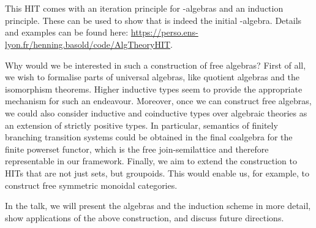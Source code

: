 \documentclass{easychair}
\begin{document}
\begin{code}
\AgdaSpace{}%
\AgdaSymbol{)}\AgdaSpace{}%
\AgdaSpace{}%
\AgdaSpace{}%
\<%
\\
\>[6]%
\>[13]\AgdaSymbol{:}\AgdaSpace{}%
\AgdaSpace{}%
\AgdaSymbol{\{}\AgdaSpace{}%
\AgdaSymbol{\}}\AgdaSpace{}%
\AgdaSpace{}%
\AgdaSpace{}%
\AgdaSpace{}%
\AgdaSpace{}%
\AgdaSpace{}%
\AgdaSpace{}%
\AgdaSpace{}%
\AgdaOperator{\AgdaDatatype{==}}\AgdaSpace{}%
\AgdaSpace{}%
\<%
\\
%
\>[6]%
\>[13]\AgdaSymbol{:}\AgdaSpace{}%
\AgdaSpace{}%
\AgdaSymbol{(}\AgdaSpace{}%
\AgdaSymbol{)}\<%
\end{code}

This HIT comes with an iteration principle for -algebras and an
induction principle.
These can be used to show that  is indeed the initial
-algebra.
Details and examples can be found here:
\url{https://perso.ens-lyon.fr/henning.basold/code/AlgTheoryHIT}.

Why would we be interested in such a construction of free algebras?
First of all, we wish to formalise parts of universal algebras, like
quotient algebras and the isomorphism theorems.
Higher inductive types seem to provide the appropriate mechanism for such
an endeavour.
Moreover, once we can construct free algebras, we could also consider inductive
and coinductive types over algebraic theories as an extension of strictly
positive types.
In particular, semantics of finitely branching transition systems could be
obtained in the final coalgebra for the finite powerset functor, which is
the free join-semilattice and therefore representable in our framework.
Finally, we aim to extend the construction to HITs that are not just sets, but
groupoids.
This would enable us, for example, to construct free symmetric monoidal
categories.

In the talk, we will present the algebras and the induction scheme in more
detail, show applications of the above construction, and discuss future
directions.


%
%
%


\end{document}
